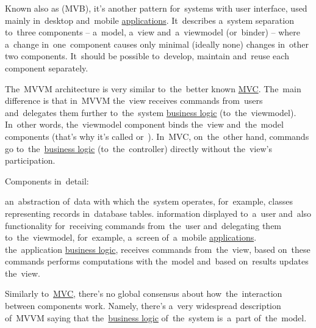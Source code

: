 \label{mvvm}
Known also as  (MVB), it's another pattern for~systems with user interface, used mainly in~desktop and~mobile \hyperref[applicationprocessprogramservicethread]{applications}.
It~describes a~system separation to~three components -- a~model, a~view and~a~viewmodel (or~binder) -- where a~change in~one~component causes only minimal (ideally none) changes in~other two components.
It~should be possible to~develop, maintain and~reuse each component separately.

The~MVVM architecture is very similar to~the~better known \hyperref[mvc]{MVC}.
The~main difference is that in~MVVM the~view receives commands from~users and~delegates them further to~the~system \hyperref[businesslogic]{business logic} (to~the~viewmodel).
In~other words, the~viewmodel component binds the~view and~the~model components (that's why it's called  \mbox{or }).
In~MVC, on~the~other hand, commands go to~the~\hyperref[businesslogic]{business logic} (to~the~controller) directly without the~view's participation.
\newline

\noindent Components in~detail:
\begin{itemize}
     an~abstraction of~data with which the~system operates, for~example, classes representing records in~database tables.
     information displayed to~a~user and~also functionality for~receiving commands from~the~user and~delegating them to~the~viewmodel, for~example, a~screen of~a~mobile \hyperref[applicationprocessprogramservicethread]{applications}.
     the~application \hyperref[businesslogic]{business logic}, receives commands from~the~view, based on~these commands performs computations with the~model and~based on~results updates the~view.
\end{itemize}

\warning Similarly to~\hyperref[mvc]{MVC}, there's no global consensus about how~the~interaction between components work.
Namely, there's a~very widespread description of~MVVM saying that the~\hyperref[businesslogic]{business logic} of~the~system is~a~part of~the~model.

